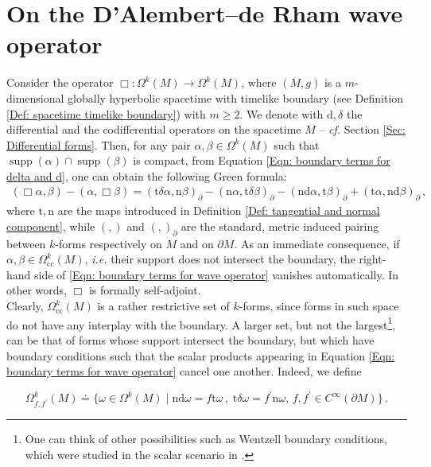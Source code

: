 \section{On the D'Alembert--de Rham wave operator}\label{Sec: on the D'Alembert--de Rham wave operator}

Consider the operator $\Box:\Omega^k(M)\to\Omega^k(M)$, where $(M,g)$ is a $m$-dimensional globally hyperbolic spacetime with timelike boundary (see Definition \ref{Def: spacetime timelike boundary}) with $m\geq 2$. We denote with $\mathrm{d},\delta$ the differential and the codifferential operators on the spacetime $M$ -- \emph{cf.} Section \ref{Sec: Differential forms}. Then, for any pair $\alpha,\beta\in\Omega^k(M)$ such that $\operatorname{supp}(\alpha)\cap\operatorname{supp}(\beta)$ is compact, from Equation \eqref{Eqn: boundary terms for delta and d}, one can obtain the following Green formula:
\begin{align}\label{Eqn: boundary terms for wave operator}
(\Box\alpha,\beta)-(\alpha,\Box\beta)=
(\mathrm{t}\delta\alpha,\mathrm{n}\beta)_\partial-
(\mathrm{n}\alpha,\mathrm{t}\delta\beta)_\partial-
(\mathrm{n}\mathrm{d}\alpha,\mathrm{t}\beta)_\partial+
(\mathrm{t}\alpha,\mathrm{n}\mathrm{d}\beta)_\partial\,,
\end{align}
where $\mathrm{t,n}$ are the maps introduced in Definition \ref{Def: tangential and normal component}, while $(,)$ and $(,)_\partial$ are the standard, metric induced pairing between $k$-forms respectively on $M$ and on $\partial M$.
As an immediate consequence, if $\alpha,\beta\in \Omega_{\mathrm{cc}}^k(M)$, \emph{i.e.} their support does not intersect the boundary, the right-hand side of \eqref{Eqn: boundary terms for wave operator} vanishes automatically. In other words, $\Box$ is formally self-adjoint.\\
Clearly, $\Omega_{\mathrm{cc}}^k(M)$ is a rather restrictive set of $k$-forms, since forms in such space do not have any interplay with the boundary. A larger set, but not the largest\footnote{One can think of other possibilities such as Wentzell boundary conditions, which were studied in the scalar scenario in \cite{Dappiaggi-Drago-Ferreira-19,Dappiaggi:2018pju,Zahn:2015due}.}, can be that of forms whose support intersect the boundary, but which have boundary conditions such that the scalar products appearing in Equation \eqref{Eqn: boundary terms for wave operator} cancel one another. Indeed, we define

\begin{equation}\label{Eqn: f,f' boundary condition}
\Omega^k_{f,f^\prime}(M)\doteq\{\omega\in\Omega^k(M)\;|\;\mathrm{nd}\omega=f\mathrm{t}\omega\,,\;\mathrm{t}\delta\omega=f^\prime \mathrm{n}\omega,\,f,f^\prime\in C^\infty(\partial M)  \}\,.
\end{equation}

